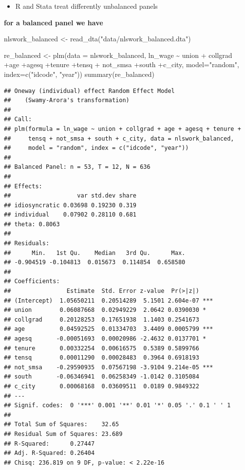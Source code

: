 \documentclass[
]{article}
\newenvironment{Shaded}{\begin{snugshade}}{\end{snugshade}}
\newcommand{\AttributeTok}[1]{\textcolor[rgb]{0.77,0.63,0.00}{#1}}
\newcommand{\FunctionTok}[1]{\textcolor[rgb]{0.00,0.00,0.00}{#1}}
\newcommand{\NormalTok}[1]{#1}
\newcommand{\OtherTok}[1]{\textcolor[rgb]{0.56,0.35,0.01}{#1}}
\newcommand{\SpecialCharTok}[1]{\textcolor[rgb]{0.00,0.00,0.00}{#1}}
\newcommand{\StringTok}[1]{\textcolor[rgb]{0.31,0.60,0.02}{#1}}
\providecommand{\tightlist}{%
  \setlength{\itemsep}{0pt}\setlength{\parskip}{0pt}}
\begin{document}
\begin{itemize}
\tightlist
\item
  R and Stata treat differently unbalanced panels
\end{itemize}

\textbf{for a balanced panel we have}

\begin{Shaded}
\begin{Highlighting}[]
\NormalTok{  nlswork\_balanced }\OtherTok{\textless{}{-}} \FunctionTok{read\_dta}\NormalTok{(}\StringTok{"data/nlswork\_balanced.dta"}\NormalTok{)}
  
\NormalTok{  re\_balanced }\OtherTok{\textless{}{-}} \FunctionTok{plm}\NormalTok{(}\AttributeTok{data =}\NormalTok{ nlswork\_balanced, ln\_wage }\SpecialCharTok{\textasciitilde{}}\NormalTok{ union }\SpecialCharTok{+}
\NormalTok{                       collgrad }\SpecialCharTok{+}\NormalTok{age }\SpecialCharTok{+}\NormalTok{agesq }\SpecialCharTok{+}\NormalTok{tenure }\SpecialCharTok{+}\NormalTok{tensq }\SpecialCharTok{+}
\NormalTok{                       not\_smsa }\SpecialCharTok{+}\NormalTok{south }\SpecialCharTok{+}\NormalTok{c\_city, }\AttributeTok{model=}\StringTok{"random"}\NormalTok{,}
                     \AttributeTok{index=}\FunctionTok{c}\NormalTok{(}\StringTok{"idcode"}\NormalTok{, }\StringTok{"year"}\NormalTok{))}
      \FunctionTok{summary}\NormalTok{(re\_balanced)}
\end{Highlighting}
\end{Shaded}

\begin{verbatim}
## Oneway (individual) effect Random Effect Model 
##    (Swamy-Arora's transformation)
## 
## Call:
## plm(formula = ln_wage ~ union + collgrad + age + agesq + tenure + 
##     tensq + not_smsa + south + c_city, data = nlswork_balanced, 
##     model = "random", index = c("idcode", "year"))
## 
## Balanced Panel: n = 53, T = 12, N = 636
## 
## Effects:
##                   var std.dev share
## idiosyncratic 0.03698 0.19230 0.319
## individual    0.07902 0.28110 0.681
## theta: 0.8063
## 
## Residuals:
##      Min.   1st Qu.    Median   3rd Qu.      Max. 
## -0.904519 -0.104813  0.015673  0.114854  0.658580 
## 
## Coefficients:
##                Estimate  Std. Error z-value  Pr(>|z|)    
## (Intercept)  1.05650211  0.20514289  5.1501 2.604e-07 ***
## union        0.06087668  0.02949229  2.0642 0.0390030 *  
## collgrad     0.20128253  0.17651938  1.1403 0.2541673    
## age          0.04592525  0.01334703  3.4409 0.0005799 ***
## agesq       -0.00051693  0.00020986 -2.4632 0.0137701 *  
## tenure       0.00332254  0.00616575  0.5389 0.5899766    
## tensq        0.00011290  0.00028483  0.3964 0.6918193    
## not_smsa    -0.29590935  0.07567198 -3.9104 9.214e-05 ***
## south       -0.06346941  0.06258349 -1.0142 0.3105084    
## c_city       0.00068168  0.03609511  0.0189 0.9849322    
## ---
## Signif. codes:  0 '***' 0.001 '**' 0.01 '*' 0.05 '.' 0.1 ' ' 1
## 
## Total Sum of Squares:    32.65
## Residual Sum of Squares: 23.689
## R-Squared:      0.27447
## Adj. R-Squared: 0.26404
## Chisq: 236.819 on 9 DF, p-value: < 2.22e-16
\end{verbatim}
\end{document}

